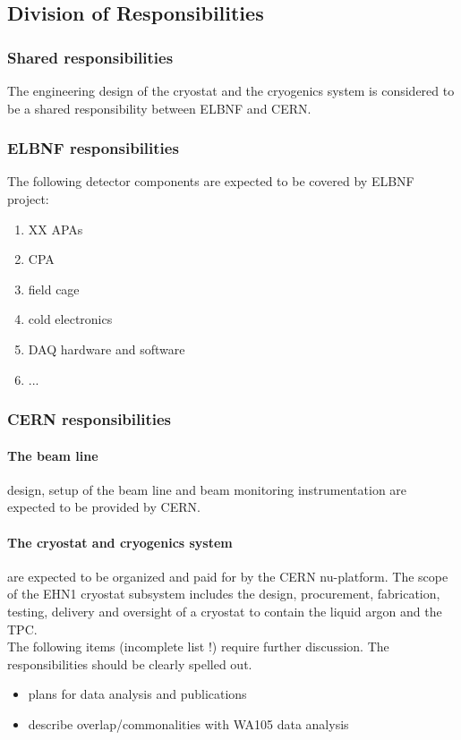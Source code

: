 \subsection{Division of Responsibilities}

\subsubsection{Shared responsibilities}

The engineering design of the cryostat and the cryogenics system is considered to be a shared responsibility between ELBNF and CERN.


\subsubsection{ELBNF responsibilities}

The following detector components are expected to be covered by ELBNF project:
\begin{enumerate}
\item XX APAs
\item CPA
\item field cage
\item cold electronics
\item DAQ hardware and software
\item ...
\end{enumerate}



\subsubsection{CERN responsibilities}

\paragraph{The beam line} design, setup of the beam line and beam monitoring instrumentation are expected to be provided by CERN.

\paragraph{The cryostat and cryogenics system} are expected to be organized and paid for by the CERN nu-platform.
The scope of the EHN1 cryostat subsystem includes the design, procurement, fabrication, testing, delivery and oversight of a cryostat to contain the liquid argon and the TPC.\\


The following items (incomplete list !) require further discussion. The responsibilities should be clearly spelled out.

\begin{itemize}

\item plans for data analysis and publications

\item describe overlap/commonalities with WA105 data analysis

\end{itemize}

